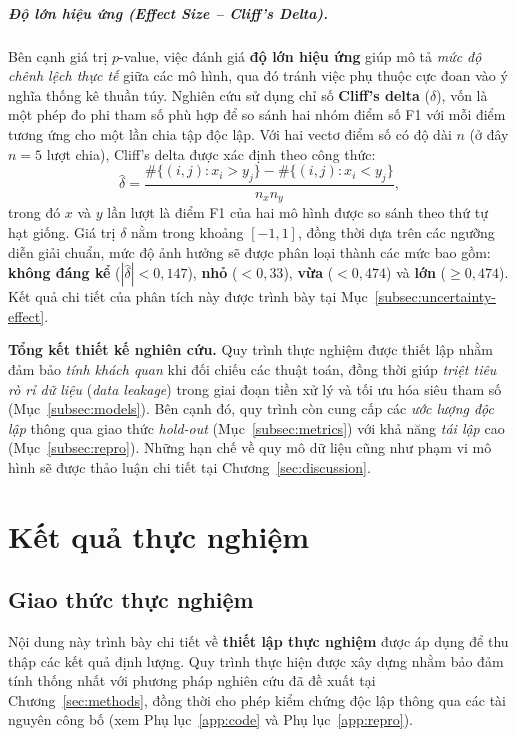 \documentclass[14pt,a4paper]{extreport}
\begin{document}
\paragraph{Độ lớn hiệu ứng (\textit{Effect Size -- Cliff's Delta}).}
Bên cạnh giá trị $p$-value, việc đánh giá \textbf{độ lớn hiệu ứng} giúp mô tả \emph{mức độ chênh lệch thực tế} giữa các mô hình, qua đó tránh việc phụ thuộc cực đoan vào ý nghĩa thống kê thuần túy. Nghiên cứu sử dụng chỉ số \textbf{Cliff's delta} ($\delta$), vốn là một phép đo phi tham số phù hợp để so sánh hai nhóm điểm số F1 với mỗi điểm tương ứng cho một lần chia tập độc lập. Với hai vectơ điểm số có độ dài $n$ (ở đây $n=5$ lượt chia), Cliff's delta được xác định theo công thức:
\[
\hat{\delta} = \frac{\#\{(i,j): x_i > y_j\} - \#\{(i,j): x_i < y_j\}}{n_x n_y},
\]
trong đó $x$ và $y$ lần lượt là điểm F1 của hai mô hình được so sánh theo thứ tự hạt giống. Giá trị $\delta$ nằm trong khoảng $[-1, 1]$, đồng thời dựa trên các ngưỡng diễn giải chuẩn, mức độ ảnh hưởng sẽ được phân loại thành các mức bao gồm: \textbf{không đáng kể} ($|\hat{\delta}| < 0,147$), \textbf{nhỏ} ($< 0,33$), \textbf{vừa} ($< 0,474$) và \textbf{lớn} ($\geq 0,474$). Kết quả chi tiết của phân tích này được trình bày tại Mục~\ref{subsec:uncertainty-effect}.

\noindent\textbf{Tổng kết thiết kế nghiên cứu.} Quy trình thực nghiệm được thiết lập nhằm đảm bảo \emph{tính khách quan} khi đối chiếu các thuật toán, đồng thời giúp \emph{triệt tiêu rò rỉ dữ liệu} (\textit{data leakage}) trong giai đoạn tiền xử lý và tối ưu hóa siêu tham số (Mục~\ref{subsec:models}). Bên cạnh đó, quy trình còn cung cấp các \emph{ước lượng độc lập} thông qua giao thức \textit{hold-out} (Mục~\ref{subsec:metrics}) với khả năng \emph{tái lập} cao (Mục~\ref{subsec:repro}). Những hạn chế về quy mô dữ liệu cũng như phạm vi mô hình sẽ được thảo luận chi tiết tại Chương~\ref{sec:discussion}.

\chapter{Kết quả thực nghiệm}
\label{sec:results}

\section{Giao thức thực nghiệm}
\label{subsec:protocol}

Nội dung này trình bày chi tiết về \textbf{thiết lập thực nghiệm} được áp dụng để thu thập các kết quả định lượng. Quy trình thực hiện được xây dựng nhằm bảo đảm tính thống nhất với phương pháp nghiên cứu đã đề xuất tại Chương~\ref{sec:methods}, đồng thời cho phép kiểm chứng độc lập thông qua các tài nguyên công bố (xem Phụ lục~\ref{app:code} và Phụ lục~\ref{app:repro}).\cite{pedregosa2011}
\end{document}
